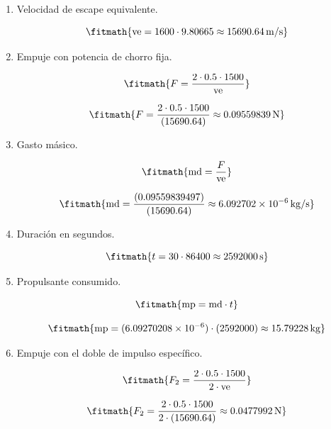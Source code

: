 \begin{enumerate}

\item Velocidad de escape equivalente.

\[\fitmath{\mathrm{ve}=1600\cdot 9.80665\approx 15690.64\,\mathrm{m/s}}\]

\item Empuje con potencia de chorro fija.

\[\fitmath{F=\frac{2\cdot 0.5\cdot 1500}{\mathrm{ve}}}\]

\[\fitmath{F=\frac{2\cdot 0.5\cdot 1500}{(15690.64)}\approx 0.09559839\,\mathrm{N}}\]

\item Gasto másico.

\[\fitmath{\mathrm{md}=\frac{F}{\mathrm{ve}}}\]

\[\fitmath{\mathrm{md}=\frac{(0.09559839497)}{(15690.64)}\approx 6.092702\times10^{-6}\,\mathrm{kg/s}}\]

\item Duración en segundos.

\[\fitmath{t=30\cdot 86400\approx 2592000\,\mathrm{s}}\]

\item Propulsante consumido.

\[\fitmath{\mathrm{mp}=\mathrm{md}\cdot t}\]

\[\fitmath{\mathrm{mp}=(6.09270208\times10^{-6})\cdot (2592000)\approx 15.79228\,\mathrm{kg}}\]

\item Empuje con el doble de impulso específico.

\[\fitmath{F_{2}=\frac{2\cdot 0.5\cdot 1500}{2\cdot \mathrm{ve}}}\]

\[\fitmath{F_{2}=\frac{2\cdot 0.5\cdot 1500}{2\cdot (15690.64)}\approx 0.0477992\,\mathrm{N}}\]

\end{enumerate}
